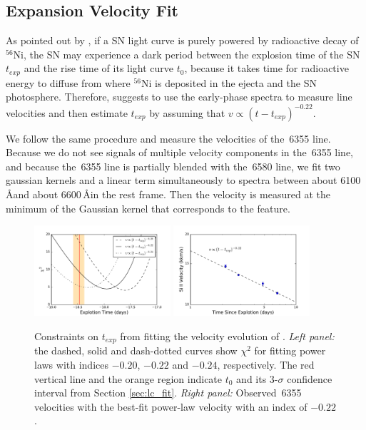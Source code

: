 \documentclass[twocolumn]{aastex61}
\begin{document}
\subsection{Expansion Velocity Fit}
\label{sec:early_vel}

As pointed out by \citet{2014ApJ...784...85P}, if a SN light curve is
purely powered by radioactive decay of $^{56}$Ni, the SN may
experience a dark period between the explosion time of the SN
$t_{exp}$ and the rise time of its light curve $t_0$, because it takes
time for radioactive energy to diffuse from where $^{56}$Ni is
deposited in the ejecta and the SN photosphere. Therefore,
\citet{2014ApJ...784...85P} suggests to use the early-phase spectra to
measure line velocities and then estimate $t_{exp}$ by assuming that
$v\propto (t-t_{exp})^{-0.22}$.

We follow the same procedure and
measure the velocities of the \,6355 line. Because we do
not see signals of multiple velocity components in the
\,6355 line, and because the \,6355 line is
partially blended with the \,6580 line, we fit two gaussian
kernels and a linear term simultaneously to spectra between about
6100\,\AA and about 6600\,\AA in the rest frame. Then the velocity is
measured at the minimum of the Gaussian kernel that corresponds to the
 feature.

\begin{figure}[htb]
  \centering
  \includegraphics[width=0.45\textwidth]{exp_date_chi2.pdf}
  \includegraphics[width=0.45\textwidth]{SiIIVelocity.pdf}
  \caption{Constraints on $t_{exp}$ from fitting the velocity
    evolution of . \textit{Left panel:} the dashed, solid
    and dash-dotted curves show $\chi^2$ for fitting power laws with
    indices $-0.20$, $-0.22$ and $-0.24$, respectively. The red
    vertical line and the orange region indicate $t_0$ and its
    3-$\sigma$ confidence interval from Section
    \ref{sec:lc_fit}. \textit{Right panel:} Observed \,6355
    velocities with the best-fit power-law velocity with an index of
    $-0.22$.}
  \label{fig:velocity_t_exp}
\end{figure}
\end{document}
